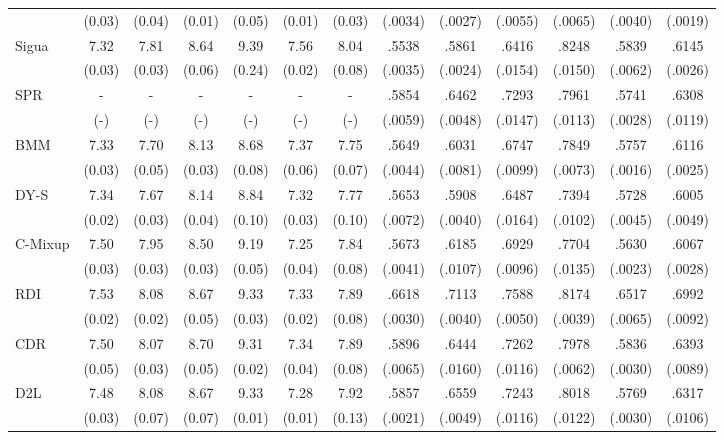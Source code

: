\documentclass{article}
\theoremstyle{plain}
\theoremstyle{definition}
\theoremstyle{remark}
\begin{document}
\begin{table}[t]
\begin{center}
\begin{small}
{\begin{tabular}{lcccccccccccc}
            & (0.03) & (0.04) & (0.01) & (0.05) & (0.01) & (0.03) &	(.0034) & (.0027) & (.0055) & (.0065) & (.0040) & (.0019) \\
        \multirow{2}{*}{Sigua} & 7.32 & 7.81 & 8.64 & 9.39 & 7.56 & 8.04 & .5538 & .5861 & .6416 & .8248 & .5839 & .6145 \\
            & (0.03) & (0.03) & (0.06) & (0.24) & (0.02) & (0.08) &	(.0035) & (.0024) & (.0154) & (.0150) & (.0062) & (.0026) \\
        \multirow{2}{*}{SPR} & -&-&-&-&-&-& .5854 & .6462 & .7293 & .7961 & .5741 & .6308 \\
            & (-)&(-)&(-)&(-)&(-)&(-)& (.0059) & (.0048) & (.0147) & (.0113) & (.0028) & (.0119) \\
        \multirow{2}{*}{BMM} & 7.33 & 7.70 & 8.13 & 8.68 & 7.37 & 7.75 & .5649 & .6031 & .6747 & .7849 & .5757 & .6116 \\
            & (0.03) & (0.05) & (0.03) & (0.08) & (0.06) & (0.07) &	(.0044) & (.0081) & (.0099) & (.0073) & (.0016) & (.0025) \\
        \multirow{2}{*}{DY-S} & 7.34 & 7.67 & 8.14 & 8.84 & 7.32 & 7.77 & .5653 & .5908 & .6487 & .7394 & .5728 & .6005 \\
            & (0.02) & (0.03) & (0.04) & (0.10) & (0.03) & (0.10) &	(.0072) & (.0040) & (.0164) & (.0102) & (.0045) & (.0049) \\
        \multirow{2}{*}{C-Mixup} & 7.50 & 7.95 & 8.50 & 9.19 & 7.25 & 7.84 & .5673 & .6185 & .6929 & .7704 & .5630 & .6067 \\
            & (0.03) & (0.03) & (0.03) & (0.05) & (0.04) & (0.08) &	(.0041) & (.0107) & (.0096) & (.0135) & (.0023) & (.0028) \\
        \multirow{2}{*}{RDI} & 7.53 & 8.08 & 8.67 & 9.33 & 7.33 & 7.89 & .6618 & .7113 & .7588 & .8174 & .6517 & .6992 \\
            & (0.02) & (0.02) & (0.05) & (0.03) & (0.02) & (0.08) &	(.0030) & (.0040) & (.0050) & (.0039) & (.0065) & (.0092) \\
        \multirow{2}{*}{CDR} & 7.50 & 8.07 & 8.70 & 9.31 & 7.34 & 7.89 & .5896 & .6444 & .7262 & .7978 & .5836 & .6393 \\
            & (0.05) & (0.03) & (0.05) & (0.02) & (0.04) & (0.08) &	(.0065) & (.0160) & (.0116) & (.0062) & (.0030) & (.0089) \\
        \multirow{2}{*}{D2L} & 7.48 & 8.08 & 8.67 & 9.33 & 7.28 & 7.92 & .5857 & .6559 & .7243 & .8018 & .5769 & .6317 \\
            & (0.03) & (0.07) & (0.07) & (0.01) & (0.01) & (0.13) &	(.0021) & (.0049) & (.0116) & (.0122) & (.0030) & (.0106) \\

\end{tabular}}
\end{small}
\end{center}
\end{table}
\end{document}
